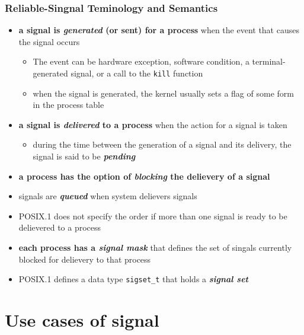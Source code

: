 \documentclass[newPxFont,sthlmFooter,nooffset]{beamer}
\begin{document}
\begin{frame}[fragile,t]
  \frametitle{Reliable-Singnal Teminology and Semantics}

\begin{itemize}
\item  \textbf{a signal is \textit{generated} (or sent) for a process } when the event that causes the signal occurs
  \begin{itemize}
  \item  \footnotesize The event can be hardware exception, software condition, a terminal-generated signal, or a call to the \texttt{kill} function
  \item  \footnotesize when the signal is generated, the kernel usually sets a flag of some form in the process table
  \end{itemize}
\item <2-> \textbf{a signal is \textit{delivered} to a process} when the action for a signal is taken
  \begin{itemize}
  \item <2-> \footnotesize during the time between the generation of a signal and its delivery, the signal is said to be \textbf{\textit{pending}}
  \end{itemize}
\item <3-> \textbf{a process has the option of \textit{blocking} the delievery of a signal}
\item <4-> signals are \textbf{\textit{queued}} when system delievers signals
\item <5-> POSIX.1 does not specify the order if more than one signal is ready to be delievered to a process
\item <6-> \textbf{each process has a \textit{signal mask}} that defines the set of singals currently blocked for delievery to that process
\item <7-> POSIX.1 defines a data type \texttt{sigset\_t} that holds a \textbf{\textit{signal set}}

\end{itemize}

  
\end{frame}




\section{Use cases of signal}
\end{document}
